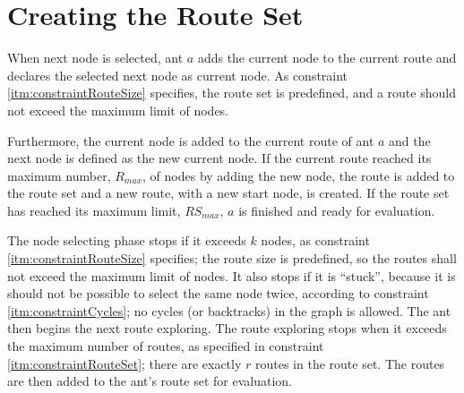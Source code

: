 \section{Creating the Route Set}

When next node is selected, ant $a$ adds the current node to the current route and declares the selected next node as current node. As constraint \vref{itm:constraintRouteSize} specifies, the route set is predefined, and a route should not exceed the maximum limit of nodes. 



Furthermore, the current node is added to the current route of ant $a$ and the next node is defined as the new current node. If the current route reached its maximum number, $R_{max}$, of nodes by adding the new node, the route is added to the route set and a new route, with a new start node, is created. If the route set has reached its maximum limit, $RS_{max}$, $a$ is finished and ready for evaluation. 


The node selecting phase stops if it exceeds $k$ nodes, as constraint \ref{itm:constraintRouteSize} specifies; the route size is predefined, so the routes shall not exceed the maximum limit of nodes. It also stops if it is ``stuck'', because it is should not be possible to select the same node twice, according to constraint \ref{itm:constraintCycles}; no cycles (or backtracks) in the graph is allowed. The ant then begins the next route exploring. The route exploring stops when it exceeds the maximum number of routes, as specified in constraint \ref{itm:constraintRouteSet}; there are exactly $r$ routes in the route set. The routes are then added to the ant's route set for evaluation.
